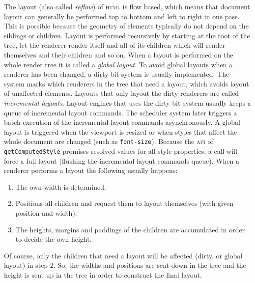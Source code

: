 \documentclass[a4paper,11pt]{kth-mag}
\newcommand{\code}[1]{\texttt{#1}}
\begin{document}
        The layout (also called \emph{reflow}) of \textsc{html} is flow based, which means that document layout can generally be performed top to bottom and left to right in one pass.
        This is possible because the geometry of elements typically do not depend on the siblings or children.
        Layout is performed recursively by starting at the root of the tree, let the renderer render itself and all of its children which will render themselves and their children and so on.
        When a layout is performed on the whole render tree it is called a \emph{global layout}.
        To avoid global layouts when a renderer has been changed, a dirty bit system is usually implemented.
        The system marks which renderers in the tree that need a layout, which avoids layout of unaffected elements.
        Layouts that only layout the dirty renderers are called \emph{incremental layouts}.
        Layout engines that uses the dirty bit system usually keeps a queue of incremental layout commands.
        The scheduler system later triggers a batch execution of the incremental layout commands asynchronously.
        A global layout is triggered when the viewport is resized or when styles that affect the whole document are changed (such as \code{font-size}).
        Because the \textsc{api} of \code{getComputedStyle} promises resolved values for all style properties, a call will force a full layout (flushing the incremental layout commands queue).
        When a renderer performs a layout the following usually happens:
        \begin{enumerate}
          \item The own width is determined.
          \item Positions all children and request them to layout themselves (with given position and width).
          \item The heights, margins and paddings of the children are accumulated in order to decide the own height.
        \end{enumerate}
        Of course, only the children that need a layout will be affected (dirty, or global layout) in step 2.
        So, the widths and positions are sent down in the tree and the height is sent up in the tree in order to construct the final layout.
\end{document}
